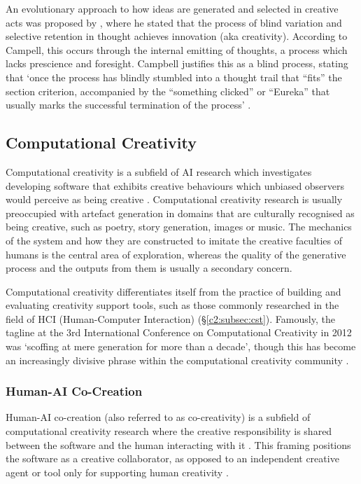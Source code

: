 An evolutionary approach to how ideas are generated and selected in creative acts was proposed by \cite{campbell1960blind}, where he stated that the process of blind variation and selective retention in thought achieves innovation (aka creativity).
According to Campell, this occurs through the internal emitting of thoughts, a process which lacks prescience and foresight.
Campbell justifies this as a blind process, stating that `once the process has blindly stumbled into a thought trail that ``fits'' the section criterion, accompanied by the ``something clicked'' or ``Eureka'' that usually marks the successful termination of the process' \citep{campbell1960blind}.

\subsection{Computational Creativity}

Computational creativity is a subfield of AI research which investigates developing software that exhibits creative behaviours which unbiased observers would perceive as being creative \citep{colton2012computational}.
Computational creativity research is usually preoccupied with artefact generation in domains that are culturally recognised as being creative, such as poetry, story generation, images or music.
The mechanics of the system and how they are constructed to imitate the creative faculties of humans is the central area of exploration, whereas the quality of the generative process and the outputs from them is usually a secondary concern.

Computational creativity differentiates itself from the practice of building and evaluating creativity support tools, such as those commonly researched in the field of HCI (Human-Computer Interaction) (\S \ref{c2:subsec:cst}).
Famously, the tagline at the 3rd International Conference on Computational Creativity in 2012 was ‘scoffing at mere generation for more than a decade’, though this has become an increasingly divisive phrase within the computational creativity community \citep{ventura2016mere}.

\subsubsection{Human-AI Co-Creation}
\label{c2:subsubsec:co-creativity}

Human-AI co-creation (also referred to as co-creativity) is a subfield of computational creativity research where the creative responsibility is shared between the software and the human interacting with it \citep{candy2002modeling}.
This framing positions the software as a creative collaborator, as opposed to an independent creative agent or tool only for supporting human creativity \citep{feldman2017co}.

